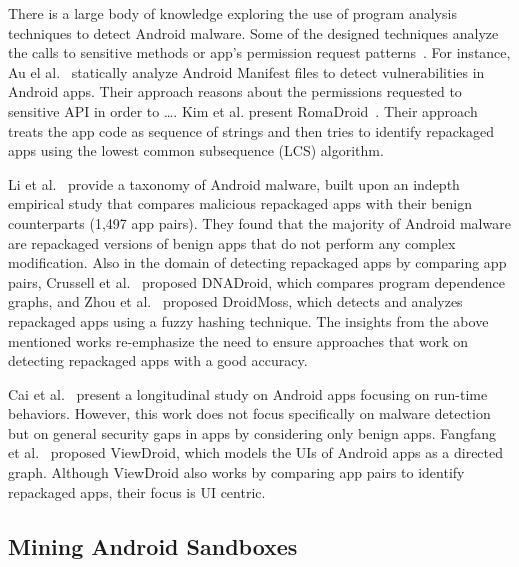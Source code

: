 {\color{red}
There is a large body of knowledge exploring the use of program analysis techniques to detect Android malware. 
Some of the designed techniques analyze the calls to sensitive methods or app's permission request
patterns~\cite{DBLP:conf/mobicom/WeiGNF12,DBLP:conf/asiajcis/WuMWLW12,DBLP:conf/sp/LiDLDG21}.
For instance, Au el al.~\cite{DBLP:conf/ccs/AuZHL12} statically analyze Android Manifest files to detect vulnerabilities in Android apps.
Their approach reasons about the permissions requested to sensitive API {\color{blue}in order to \ldots}. 
Kim et al. present RomaDroid~\cite{DBLP:journals/access/KimLCP19}.  Their approach treats the app code as
sequence of strings and then tries to identify repackaged apps using the lowest common subsequence (LCS) algorithm. 

Li et al.~\cite{DBLP:journals/tifs/0029LBKTLC17} provide a taxonomy of Android malware, built upon an indepth empirical study that compares malicious repackaged apps with their benign counterparts (1,497 app pairs). They found that the majority of Android malware are repackaged versions of benign apps that do not perform any complex modification. Also in the domain of detecting repackaged apps by comparing app pairs, Crussell et al.~\cite{DBLP:conf/esorics/CrussellGC12} proposed  DNADroid, which compares program dependence graphs, and Zhou et al.~\cite{DBLP:conf/codaspy/ZhouZJN12} proposed DroidMoss, which detects and analyzes repackaged apps using a fuzzy hashing technique. The insights from the above mentioned works re-emphasize the need to ensure approaches that work on detecting repackaged apps with a good accuracy. 



Cai et al.~\cite{DBLP:journals/tse/CaiR21} present
a longitudinal study on Android apps focusing on run-time behaviors. However, this work does not focus specifically on malware detection but on general security gaps in apps by considering only benign apps. Fangfang et al.~\cite{DBLP:conf/wisec/ZhangHZW014} proposed ViewDroid, which models the UIs of Android apps as a directed graph. Although ViewDroid also works by comparing app pairs to identify repackaged apps, their focus is UI centric.
}
\subsection{Mining Android Sandboxes}\label{sec:android-sandbox}

